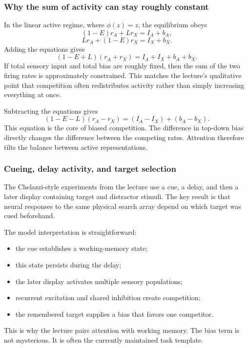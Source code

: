 \clearpage

\subsubsection{Why the sum of activity can stay roughly constant}

In the linear active regime, where \(\phi(z)=z\), the equilibrium obeys
\[
(1-E)r_A + Lr_X = I_A+b_A,
\]
\[
Lr_A + (1-E)r_X = I_X+b_X.
\]
Adding the equations gives
\[
(1-E+L)(r_A+r_X)
=
I_A+I_X+b_A+b_X.
\]
If total sensory input and total bias are roughly fixed, then the sum of the two firing rates is approximately constrained. This matches the lecture's qualitative point that competition often redistributes activity rather than simply increasing everything at once.

Subtracting the equations gives
\[
(1-E-L)(r_A-r_X)
=
(I_A-I_X)+(b_A-b_X).
\]
This equation is the core of biased competition. The difference in top-down bias directly changes the difference between the competing rates. Attention therefore tilts the balance between active representations.

\subsubsection{Cueing, delay activity, and target selection}

The Chelazzi-style experiments from the lecture use a cue, a delay, and then a later display containing target and distractor stimuli. The key result is that neural responses to the same physical search array depend on which target was cued beforehand.

The model interpretation is straightforward:
\begin{itemize}
    \item the cue establishes a working-memory state;
    \item this state persists during the delay;
    \item the later display activates multiple sensory populations;
    \item recurrent excitation and shared inhibition create competition;
    \item the remembered target supplies a bias that favors one competitor.
\end{itemize}

This is why the lecture pairs attention with working memory. The bias term is not mysterious. It is often the currently maintained task template.

